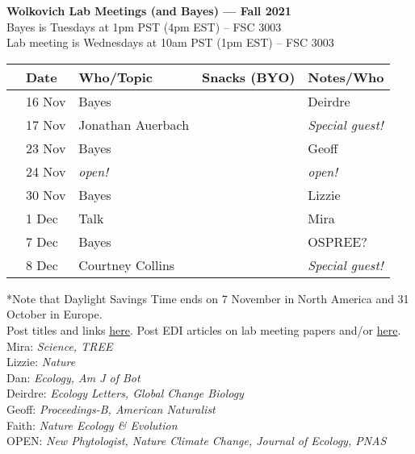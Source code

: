 \documentclass[11pt]{article}
\begin{document}
 
\raggedright
{}

\begin{center} 
{\large \textbf{Wolkovich Lab Meetings (and Bayes) --- Fall 2021}} \\ [2pt]
Bayes is Tuesdays at 1pm PST (4pm EST) -- FSC 3003\\
Lab meeting is Wednesdays at 10am PST (1pm EST) -- FSC 3003\\
\end{center} 

\begin{center}
\begin{tabular}{ p{0.2 cm}  p{2 cm}  p{4.5 cm}  p{3 cm}  p{3.5 cm} }  \hline \hline
 & \textbf{Date}
   & \textbf{Who/Topic}
      & \textbf{Snacks (BYO)} 
         & \textbf{Notes/Who} \\ 
\hline \hline
 & 16 Nov & Bayes &       & Deirdre\\\hline
 & 17  Nov & Jonathan Auerbach & & \emph{Special guest!}   \\\hline
 & 23 Nov & Bayes &       & Geoff\\\hline  
 & 24 Nov & \emph{open!}  &       & \emph{open!}  \\\hline
 & 30 Nov &  Bayes  &     & Lizzie \\\hline %
 & 1 Dec &  Talk &       &   Mira \\\hline
 & 7 Dec & Bayes &    & OSPREE?\\\hline
 & 8 Dec &  Courtney Collins &    & \emph{Special guest!}  \\\hline %
\hline
\end{tabular}
\end{center}
*Note that Daylight Savings Time ends on 7 November in North America and 31 October in Europe.\\
\vspace{7pt}
 Post titles and links \href{https://docs.google.com/document/d/1j0WdDbjdp8ERLSO7whvtnP-tOblYMlX33TSCXy_uRKo/edit?usp=sharing}{\underline{here}}. Post EDI articles on lab meeting papers and/or  \href{https://docs.google.com/document/d/18VbP-03oD0BsArxYm60g1ZvvFL7IoA3-6rpdHb1eLPw/edit#heading=h.gsqcglkhxkzg}{here}.\\
Mira: \emph{Science, TREE} \\
Lizzie: \emph{Nature}\\
Dan: \emph{Ecology, Am J of Bot }\\
Deirdre: \emph{Ecology Letters, Global Change Biology}\\
Geoff: \emph{Proceedings-B, American Naturalist} \\
Faith: \emph{Nature Ecology \& Evolution}\\
OPEN: \emph{New Phytologist, Nature Climate Change, Journal of Ecology, PNAS}\\
\end{document}
